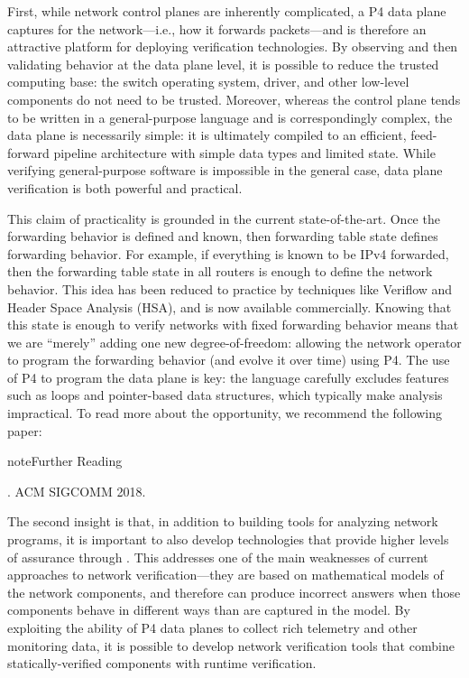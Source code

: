 \documentclass[letterpaper,11pt,english]{sphinxmanual}
\begin{document}
First, while network control planes are inherently complicated, a P4
data plane captures  for the network—i.e., how it
forwards packets—and is therefore an attractive platform for deploying
verification technologies. By observing and then validating behavior
at the data plane level, it is possible to reduce the trusted
computing base: the switch operating system, driver, and other
low-level components do not need to be trusted. Moreover, whereas the
control plane tends to be written in a general-purpose language and is
correspondingly complex, the data plane is necessarily simple: it is
ultimately compiled to an efficient, feed-forward pipeline
architecture with simple data types and limited state. While verifying
general-purpose software is impossible in the general case, data plane
verification is both powerful and practical.

This claim of practicality is grounded in the current
state-of-the-art.  Once the forwarding behavior is defined and known,
then forwarding table state defines forwarding behavior. For example,
if everything is known to be IPv4 forwarded, then the forwarding table
state in all routers is enough to define the network behavior. This
idea has been reduced to practice by techniques like Veriflow and
Header Space Analysis (HSA), and is now available commercially.
Knowing that this state is enough to verify networks with fixed
forwarding behavior means that we are “merely” adding one new
degree-of-freedom: allowing the network operator to program the
forwarding behavior (and evolve it over time) using P4. The use of P4
to program the data plane is key: the language carefully excludes
features such as loops and pointer-based data structures, which
typically make analysis impractical. To read more about the
opportunity, we recommend the following paper:

\label{\detokenize{future:reading-p4}}
\begin{sphinxadmonition}{note}{Further Reading}

. ACM
SIGCOMM 2018.
\end{sphinxadmonition}

The second insight is that, in addition to building tools for
analyzing network programs, it is important to also develop
technologies that provide higher levels of assurance through
. This addresses one of the main weaknesses of
current approaches to network verification—they are based on
mathematical models of the network components, and therefore can
produce incorrect answers when those components behave in different
ways than are captured in the model. By exploiting the ability of P4
data planes to collect rich telemetry and other monitoring data, it is
possible to develop network verification tools that combine
statically-verified components with runtime verification.
\end{document}

